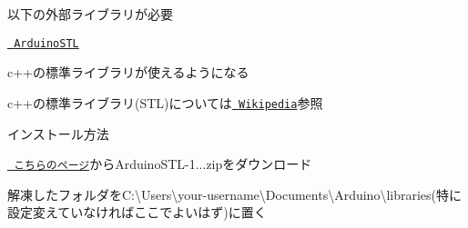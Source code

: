 \begin{DoxyItemize}
\item 以下の外部ライブラリが必要
\begin{DoxyItemize}
\item \href{https://www.arduinolibraries.info/libraries/arduino-stl}{\texttt{ Arduino\+S\+TL}}
\begin{DoxyItemize}
\item c++の標準ライブラリが使えるようになる
\begin{DoxyItemize}
\item c++の標準ライブラリ(S\+TL)については\href{https://ja.wikipedia.org/wiki/Standard_Template_Library}{\texttt{ Wikipedia}}参照
\end{DoxyItemize}
\item インストール方法
\begin{DoxyItemize}
\item \href{https://www.arduinolibraries.info/libraries/arduino-stl}{\texttt{ こちらのページ}}から{\ttfamily Arduino\+S\+T\+L-\/1...\+zip}をダウンロード
\item 解凍したフォルダを{\ttfamily C\+:\textbackslash{}Users\textbackslash{}your-\/username\textbackslash{}Documents\textbackslash{}Arduino\textbackslash{}libraries}(特に設定変えていなければここでよいはず)に置く 
\end{DoxyItemize}
\end{DoxyItemize}
\end{DoxyItemize}
\end{DoxyItemize}
